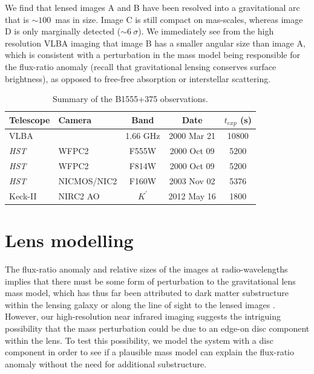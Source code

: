 \documentclass[a4paper,fleqn,usenatbib,useAMS]{mnras}
\begin{document}
We find that lensed images A and B have been resolved into a gravitational arc that is $\sim100$~mas in size. Image C is still compact on mas-scales, whereas image D is only marginally detected ($\sim6~\sigma$). We immediately see from the high resolution VLBA imaging that image B has a smaller angular size than image A, which is consistent with a perturbation in the mass model being responsible for the flux-ratio anomaly (recall that gravitational lensing conserves surface brightness), as opposed to free-free absorption or interstellar scattering.

\begin{table}
\centering
\caption{Summary of the B1555+375 observations.}
\begin{tabular}{llccc}
\hline
Telescope		& Camera			&  Band 		& Date				&$t_{exp}$ (s) \\
\hline
VLBA			&					& 1.66 GHz	& 	2000 Mar 21	& 10800\\
\textit{HST}	& WFPC2    		& F555W		&	2000 Oct 09	& 5200\\
\textit{HST}	& WFPC2    		& F814W		&	2000 Oct 09 	& 5200\\
\textit{HST}	& NICMOS/NIC2	& F160W		&	2003 Nov 02	& 5376\\
Keck-II			& NIRC2 AO		& $K^\prime$	& 	2012 May 16	& 1800\\
\hline
\end{tabular}
\label{tab:obs}
\end{table}

\section{Lens modelling}

The flux-ratio anomaly and relative sizes of the images at radio-wavelengths implies that there must be some form of perturbation to the gravitational lens mass model, which has thus far been attributed to dark matter substructure within the lensing galaxy or along the line of sight to the lensed images \citep{Dalal2002,Xu12,Xu15}. However, our high-resolution near infrared imaging suggests the intriguing possibility that the mass perturbation could be due to an edge-on disc component within the lens. To test this possibility, we model the system with a disc component in order to see if a plausible mass model can explain the flux-ratio anomaly without the need for additional substructure.
\end{document}
